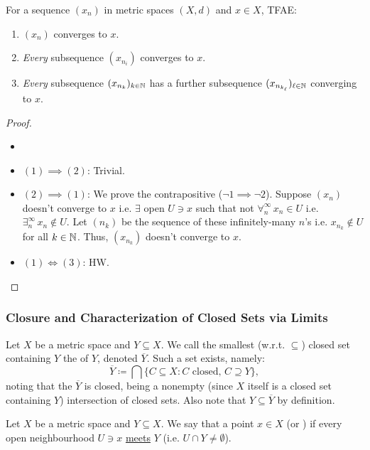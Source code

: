 \documentclass[14pt,oneside]{extarticle}
\begin{document}
\begin{proposition*}
  For a sequence $(x_n)$ in metric spaces $(X,d)$ and $x \in X$, TFAE:
  \begin{enumerate}[nosep]
    \item $(x_n)$ converges to $x$.
    \item \textit{Every} subsequence $(x_{n_i})$ converges to $x$.
    \item \textit{Every} subsequence $(x_{n_k})_{k \in \mathbb{N}}$ has a further subsequence $(x_{n_{k_\ell}})_{\ell \in \mathbb{N}}$ converging to $x$.
  \end{enumerate}
\end{proposition*}
\begin{proof}
  \begin{itemize}[label=]
  \item
  \item $(1) \implies (2)$: Trivial.
  \item $(2) \implies (1)$: We prove the contrapositive ($\neg 1 \implies \neg 2$). Suppose $(x_n)$ doesn't converge to $x$ i.e. $\exists$ open $U \ni x$ such that not $\forall^\infty_n \, x_n \in U$ i.e. $\exists^\infty_n \, x_n \notin U$. Let $(n_k)$ be the sequence of these infinitely-many $n$'s i.e. $x_{n_k} \notin U$ for all $k \in \mathbb{N}$. Thus, $(x_{n_k})$ doesn't converge to $x$.
  \item $(1) \iff (3)$: HW.
  \end{itemize}
\end{proof}

\subsubsection{Closure and Characterization of Closed Sets via Limits}
\begin{definition*}
  Let $X$ be a metric space and $Y \subseteq X$. We call the smallest (w.r.t. $\subseteq$) closed set containing $Y$ the  of $Y$, denoted $\overline{Y}$. Such a set exists, namely:
  \[\overline{Y} \coloneqq \bigcap \{C \subseteq X: C \text{ closed, } C \supseteq Y\},\]
  noting that the $\overline{Y}$ is closed, being a nonempty (since $X$ itself is a closed set containing $Y$) intersection of closed sets. Also note that $Y \subseteq \overline{Y}$ by definition.
\end{definition*}
\begin{definition*}
  Let $X$ be a metric space and $Y \subseteq X$. We say that a point $x \in X$  (or ) if every open neighbourhood $U \ni x$ \underline{meets} $Y$ (i.e. $U \cap Y \neq \emptyset$).
\end{definition*}
\end{document}

